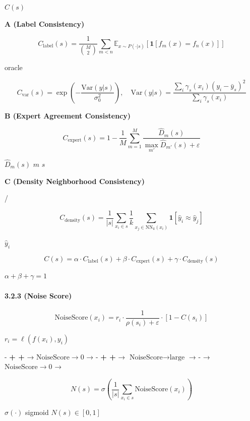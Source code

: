 \documentclass[
  12pt,
]{article}
\begin{document}
 \(C(s)\) 

\textbf{ A (Label Consistency)}



\[
C_{\text{label}}(s) = \frac{1}{\binom{M}{2}} \sum_{m < n} \mathbb{E}_{x \sim P(\cdot|s)}[\mathbf{1}[f_m(x) = f_n(x)]]
\]

 oracle \textbf{}

\[
C_{\text{var}}(s) = \exp\left(-\frac{\text{Var}(y|s)}{\sigma_0^2}\right), \quad \text{Var}(y|s) = \frac{\sum_i \gamma_s(x_i)(y_i - \bar{y}_s)^2}{\sum_i \gamma_s(x_i)}
\]

\textbf{ B (Expert Agreement Consistency)}



\[
C_{\text{expert}}(s) = 1 - \frac{1}{M} \sum_{m=1}^M \frac{\hat{D}_m(s)}{\max_{m'} \hat{D}_{m'}(s) + \varepsilon}
\]

 \(\hat{D}_m(s)\)  \(m\)  \(s\) 

\textbf{ C (Density Neighborhood Consistency)}

/

\[
C_{\text{density}}(s) = \frac{1}{|s|} \sum_{x_i \in s} \frac{1}{k} \sum_{x_j \in \text{NN}_k(x_i)} \mathbf{1}[\hat{y}_i \approx \hat{y}_j]
\]

 \(\hat{y}_i\) 

\textbf{}

\[
C(s) = \alpha \cdot C_{\text{label}}(s) + \beta \cdot C_{\text{expert}}(s) + \gamma \cdot C_{\text{density}}(s)
\]

 \(\alpha + \beta + \gamma = 1\)

\paragraph{3.2.3  (Noise
Score)}\label{ux566aux58f0ux5206ux6570-noise-score}

\textbf{}

\[
\text{NoiseScore}(x_i) = r_i \cdot \frac{1}{\rho(s_i) + \varepsilon} \cdot [1 - C(s_i)]
\]

 \(r_i = \ell(f(x_i), y_i)\) 

 - \textbf{ +  + } →
\(\text{NoiseScore} \to 0\) →  - \textbf{ +  +
} → \(\text{NoiseScore} \to \text{large}\) →  -
\textbf{} → \(\text{NoiseScore} \to 0\) → 

\textbf{}

\[
N(s) = \sigma\left(\frac{1}{|s|} \sum_{x_i \in s} \text{NoiseScore}(x_i)\right)
\]

 \(\sigma(\cdot)\)  sigmoid  \(N(s) \in [0,1]\)
\end{document}

